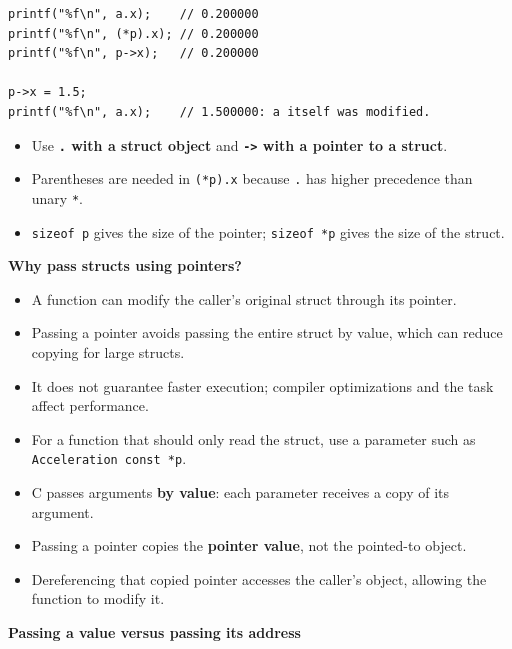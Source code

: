 \documentclass[11pt,a4paper]{article}
\begin{document}
\begin{lstlisting}[style=cscode]
printf("%f\n", a.x);    // 0.200000
printf("%f\n", (*p).x); // 0.200000
printf("%f\n", p->x);   // 0.200000

p->x = 1.5;
printf("%f\n", a.x);    // 1.500000: a itself was modified.
\end{lstlisting}

\begin{itemize}
    \item Use \textbf{\texttt{.} with a struct object} and
          \textbf{\texttt{->} with a pointer to a struct}.
    \item Parentheses are needed in \texttt{(*p).x} because
          \texttt{.} has higher precedence than unary \texttt{*}.
    \item \texttt{sizeof p} gives the size of the pointer;
          \texttt{sizeof *p} gives the size of the struct.
\end{itemize}

\textbf{Why pass structs using pointers?}

\begin{itemize}
    \item A function can modify the caller's original struct
          through its pointer.
    \item Passing a pointer avoids passing the entire struct by
          value, which can reduce copying for large structs.
    \item It does not guarantee faster execution; compiler
          optimizations and the task affect performance.
    \item For a function that should only read the struct, use
          a parameter such as \texttt{Acceleration const *p}.
\end{itemize}


\begin{itemize}
    \item C passes arguments \textbf{by value}: each parameter
          receives a copy of its argument.
    \item Passing a pointer copies the \textbf{pointer value},
          not the pointed-to object.
    \item Dereferencing that copied pointer accesses the caller's
          object, allowing the function to modify it.
\end{itemize}

\textbf{Passing a value versus passing its address}
\end{document}
